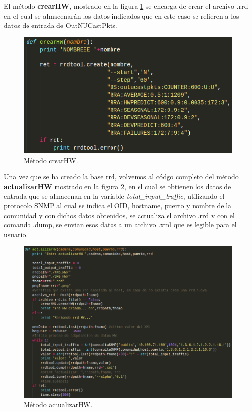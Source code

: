 El método \textbf{crearHW}, mostrado en la figura \ref{image:codigo1} se encarga de crear el archivo .rrd en el cual se almacenarán los datos indicados que en este caso se refieren a los datos de entrada de OutNUCastPkts.
\FloatBarrier
\begin{figure}[htbp!]
		\centering
			\includegraphics[width=.7 \textwidth]{images/codigo1}
		\caption{Método crearHW.}
		\label{image:codigo1}
\end{figure}
\FloatBarrier

\newpage
Una vez que se ha creado la base rrd, volvemos al códgo completo del método \textbf{actualizarHW} mostrado en la figura \ref{image:codigo3}, en el cual se obtienen los datos de entrada que se almacenan en la variable \textit{total\_input\_traffic}, utilizando el protocolo SNMP al  cual se indica el OID, hostname, puerto y nombre de la comunidad y con dichos datos obtenidos, se actualiza el archivo .rrd y con el comando .dump, se envian esos datos a un archivo .xml que es legible para el usuario.
\FloatBarrier
\begin{figure}[htbp!]
		\centering
			\includegraphics[width=1 \textwidth]{images/codigo3}
		\caption{Método actualizarHW.}
		\label{image:codigo3}
\end{figure}
\FloatBarrier


